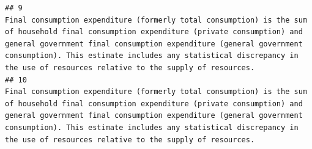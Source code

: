 \documentclass[
]{article}
\begin{document}
\begin{verbatim}
## 9                                                                                                                                                                                                                                                                                                                                                                                                                                                                                                                                                                                                                                                                                                                                                                                                                                                                                                                                                                                                                                                                                                      Final consumption expenditure (formerly total consumption) is the sum of household final consumption expenditure (private consumption) and general government final consumption expenditure (general government consumption). This estimate includes any statistical discrepancy in the use of resources relative to the supply of resources.
## 10                                                                                                                                                                                                                                                                                                                                                                                                                                                                                                                                                                                                                                                                                                                                                                                                                                                                                                                                                                                                                                                                                                     Final consumption expenditure (formerly total consumption) is the sum of household final consumption expenditure (private consumption) and general government final consumption expenditure (general government consumption). This estimate includes any statistical discrepancy in the use of resources relative to the supply of resources.

\end{verbatim}
\end{document}
